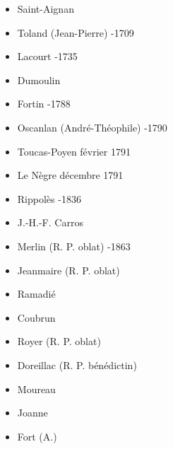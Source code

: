        \begin{itemize}
        	\item[] Saint-Aignan 
			\item[] Toland (Jean-Pierre) -1709
			\item[] Lacourt -1735
			\item[] Dumoulin 
			\item[] Fortin -1788
			\item[] Oscanlan (André-Théophile) -1790
			\item[] Toucas-Poyen  février 1791
			\item[] Le Nègre  décembre 1791
			\item[] Rippolès -1836
			\item[] J.-H.-F. Carros 
			\item[] Merlin (R. P. oblat) -1863
			\item[] Jeanmaire (R. P. oblat) 
			\item[] Ramadié 
			\item[] Coubrun 
			\item[] Royer (R. P. oblat) 
			\item[] Doreillac (R. P. bénédictin) 
			\item[] Moureau 
			\item[] Joanne 
			\item[] Fort (A.)	
        \end{itemize} 
        